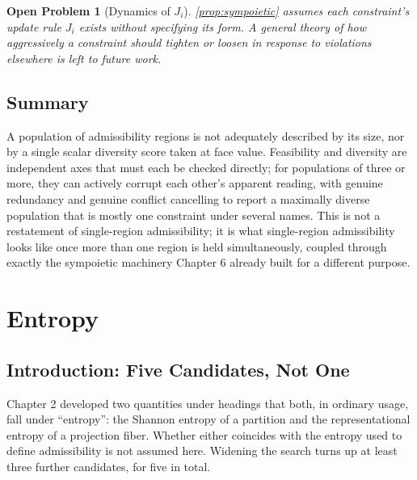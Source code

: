 \documentclass[12pt]{report}
\newtheorem{openproblem}[definition]{Open Problem}
\begin{document}
\begin{openproblem}[Dynamics of $J_i$]
\cref{prop:sympoietic} assumes each constraint's update rule $J_i$
exists without specifying its form. A general theory of how
aggressively a constraint should tighten or loosen in response to
violations elsewhere is left to future work.
\end{openproblem}

\section*{Summary}

A population of admissibility regions is not adequately described by
its size, nor by a single scalar diversity score taken at face value.
Feasibility and diversity are independent axes that must each be
checked directly; for populations of three or more, they can actively
corrupt each other's apparent reading, with genuine redundancy and
genuine conflict cancelling to report a maximally diverse population
that is mostly one constraint under several names. This is not a
restatement of single-region admissibility; it is what single-region
admissibility looks like once more than one region is held
simultaneously, coupled through exactly the sympoietic machinery
Chapter 6 already built for a different purpose.

\chapter{Entropy}

\section{Introduction: Five Candidates, Not One}
\label{sec:candidates}

Chapter 2 developed two quantities under headings that both, in ordinary
usage, fall under ``entropy'': the Shannon entropy of a partition and the
representational entropy of a projection fiber. Whether either coincides
with the entropy used to define admissibility is not assumed here.
Widening the search turns up at least three further candidates, for five
in total.
\end{document}
